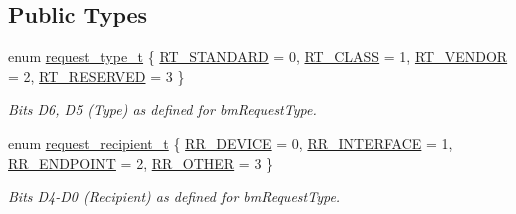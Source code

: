 \subsection*{Public Types}
\begin{DoxyCompactItemize}
\item 
enum \hyperlink{classmdt_frame_usb_control_a779262a63280a282343ada50acfda3d3}{request\-\_\-type\-\_\-t} \{ \hyperlink{classmdt_frame_usb_control_a779262a63280a282343ada50acfda3d3a8c6c5627c271ba79f4b5d0dc95f2e346}{R\-T\-\_\-\-S\-T\-A\-N\-D\-A\-R\-D} = 0, 
\hyperlink{classmdt_frame_usb_control_a779262a63280a282343ada50acfda3d3acb67765c47b1662721a5149a8945a284}{R\-T\-\_\-\-C\-L\-A\-S\-S} = 1, 
\hyperlink{classmdt_frame_usb_control_a779262a63280a282343ada50acfda3d3a39a9a2699cdcffce3c4e2d780b685506}{R\-T\-\_\-\-V\-E\-N\-D\-O\-R} = 2, 
\hyperlink{classmdt_frame_usb_control_a779262a63280a282343ada50acfda3d3a93e912c92763c97407b901e4b8955a8b}{R\-T\-\_\-\-R\-E\-S\-E\-R\-V\-E\-D} = 3
 \}
\begin{DoxyCompactList}\small\item\em Bits D6, D5 (Type) as defined for bm\-Request\-Type. \end{DoxyCompactList}\item 
enum \hyperlink{classmdt_frame_usb_control_aaf1f08b1b5e47ab18426800ed0accbde}{request\-\_\-recipient\-\_\-t} \{ \hyperlink{classmdt_frame_usb_control_aaf1f08b1b5e47ab18426800ed0accbdea136b8821e8efb19c3ccce9998a35f674}{R\-R\-\_\-\-D\-E\-V\-I\-C\-E} = 0, 
\hyperlink{classmdt_frame_usb_control_aaf1f08b1b5e47ab18426800ed0accbdeab1e676c2884ded9bfd7e3035313b6c13}{R\-R\-\_\-\-I\-N\-T\-E\-R\-F\-A\-C\-E} = 1, 
\hyperlink{classmdt_frame_usb_control_aaf1f08b1b5e47ab18426800ed0accbdea6ad7a0ecd11b108658cbd56d88280913}{R\-R\-\_\-\-E\-N\-D\-P\-O\-I\-N\-T} = 2, 
\hyperlink{classmdt_frame_usb_control_aaf1f08b1b5e47ab18426800ed0accbdea21a5f8a556b34b336f7a31032df7d721}{R\-R\-\_\-\-O\-T\-H\-E\-R} = 3
 \}
\begin{DoxyCompactList}\small\item\em Bits D4-\/\-D0 (Recipient) as defined for bm\-Request\-Type. \end{DoxyCompactList}\end{DoxyCompactItemize}
